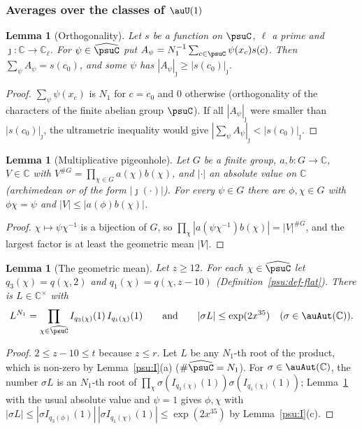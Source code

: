 \documentclass[10pt]{amsart}
\newtheorem{lemma}[theorem]{Lemma}
\theoremstyle{definition}
\theoremstyle{remark}
\newcommand{\C}{\mathbb C}
\begin{document}
\subsubsection{Averages over the classes of $\auU(1)$}\label{psu:ss-avg}

\begin{lemma}[Orthogonality]\label{psu:orth}
Let $s$ be a function on $\psuC$, $\ell$ a prime and $\jmath\colon\C\to\C_\ell$. For $\psi\in
\widehat\psuC$ put $A_\psi=N_1^{-1}\sum_{c\in\psuC}\psi(x_c)s(c)$. Then $\sum_\psi A_\psi=s(c_0)$, and
some $\psi$ has $|A_\psi|_\jmath\ge|s(c_0)|_\jmath$.
\end{lemma}
\begin{proof}
$\sum_\psi\psi(x_c)$ is $N_1$ for $c=c_0$ and $0$ otherwise (orthogonality of the characters of the
finite abelian group $\psuC$). If all $|A_\psi|_\jmath$ were smaller than $|s(c_0)|_\jmath$, the
ultrametric inequality would give $|\sum_\psi A_\psi|_\jmath<|s(c_0)|_\jmath$.
\end{proof}

\begin{lemma}[Multiplicative pigeonhole]\label{psu:pigeon}
Let $G$ be a finite group, $a,b\colon G\to\C$, $V\in\C$ with $V^{\#G}=\prod_{\chi\in G}a(\chi)b(\chi)$,
and $|\cdot|$ an absolute value on $\C$ (archimedean or of the form $|\jmath(\cdot)|$). For every
$\psi\in G$ there are $\phi,\chi\in G$ with $\phi\chi=\psi$ and $|V|\le|a(\phi)b(\chi)|$.
\end{lemma}
\begin{proof}
$\chi\mapsto\psi\chi^{-1}$ is a bijection of $G$, so $\prod_\chi|a(\psi\chi^{-1})b(\chi)|=|V|^{\#G}$,
and the largest factor is at least the geometric mean $|V|$.
\end{proof}

\begin{lemma}[The geometric mean]\label{psu:mean}
Let $z\ge12$. For each $\chi\in\widehat\psuC$ let $q_3(\chi)=q(\chi,2)$ and $q_1(\chi)=q(\chi,z-10)$
(Definition~\ref{psu:def-flat}). There is $L\in\C^\times$ with
\[
L^{N_1}=\prod_{\chi\in\widehat\psuC}I_{q_3(\chi)}(1)\,I_{q_1(\chi)}(1)\qquad\text{and}\qquad
|\sigma L|\le\exp(2x^{35})\quad(\sigma\in\auAut(\C)).
\]
\end{lemma}
\begin{proof}
$2\le z-10\le t$ because $z\le r$. Let $L$ be any $N_1$-th root of the product, which is non-zero by
Lemma~\ref{psu:I}(a) ($\#\widehat\psuC=N_1$). For $\sigma\in\auAut(\C)$, the number $\sigma L$ is an
$N_1$-th root of $\prod_\chi\sigma(I_{q_3(\chi)}(1))\sigma(I_{q_1(\chi)}(1))$; Lemma~\ref{psu:pigeon} with
the usual absolute value and $\psi=1$ gives $\phi,\chi$ with $|\sigma L|\le|\sigma I_{q_3(\phi)}(1)|\,
|\sigma I_{q_1(\chi)}(1)|\le\exp(2x^{35})$ by Lemma~\ref{psu:I}(c).
\end{proof}
\end{document}
